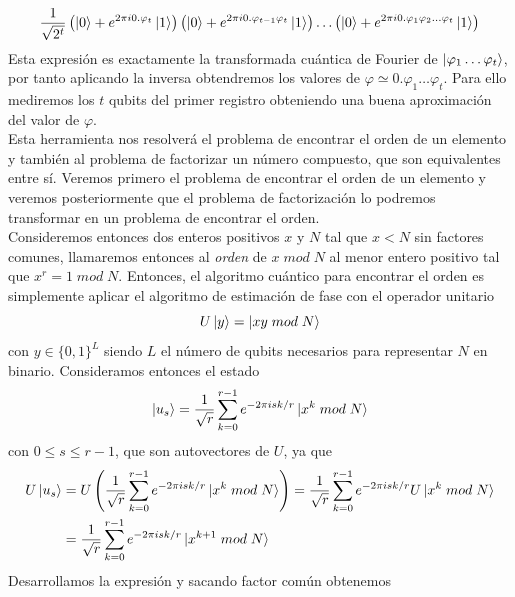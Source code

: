 \documentclass[a4paper]{article}
\numberwithin{equation}{section}
\newcommand{\modd}{\; mod \;}
\begin{document}
\begin{equation}
\frac{1}{\sqrt{2^t}}
\left( \ket{0} + e^{2\pi i 0.\varphi_t} \ket{1} \right)
\left( \ket{0} + e^{2\pi i 0.\varphi_{t-1}\varphi_t} \ket{1} \right)
\ldots
\left( \ket{0} + e^{2\pi i 0.\varphi_1\varphi_2\ldots\varphi_t} \ket{1} \right)
\end{equation}
Esta expresión es exactamente la transformada cuántica de Fourier de $\ket{\varphi_1\ldots\varphi_t}$, por tanto aplicando la inversa obtendremos los valores de $\varphi  \simeq 0.\varphi_1 \ldots \varphi_t$. Para ello mediremos los $t$ qubits del primer registro obteniendo una buena aproximación del valor de $\varphi$.\\

Esta herramienta nos resolverá el problema de encontrar el orden de un elemento y también al problema de factorizar un número compuesto, que son equivalentes entre sí. Veremos primero el problema de encontrar el orden de un elemento y veremos posteriormente que el problema de factorización lo podremos transformar en un problema de encontrar el orden.\\
\linebreak
Consideremos entonces dos enteros positivos $x$ y $N$ tal que $x<N$ sin factores comunes, llamaremos entonces al \textit{orden} de $x \modd N$ al menor entero positivo tal que $x^r =  1\modd N$. Entonces, el algoritmo cuántico para encontrar el orden es simplemente aplicar el algoritmo de estimación de fase con el operador unitario
\begin{equation}
U\ket{y} = \ket{x y \modd N}
\end{equation}
con $y \in \{0, 1\}^L$ siendo $L$ el número de qubits necesarios para representar $N$ en binario. Consideramos entonces el estado
\begin{equation}
\ket{u_s} =
\frac{1}{\sqrt{r}} \sum_{k=0}^{r-1} e^{-2\pi isk/r}\ket{x^k \modd N}
\end{equation}
con $0\leq s \leq r-1$, que son autovectores de $U$, ya que
\begin{equation}
\begin{split}
U\ket{u_s} &=
U\left( \frac{1}{\sqrt{r}} \sum_{k=0}^{r-1} e^{-2\pi isk/r}\ket{x^k \modd N} \right) =
\frac{1}{\sqrt{r}} \sum_{k=0}^{r-1} e^{-2\pi isk/r} U \ket{x^k \modd N}
\\ &=
\frac{1}{\sqrt{r}} \sum_{k=0}^{r-1} e^{-2\pi isk/r}\ket{x^{k+1} \modd N}
\end{split}
\end{equation}
Desarrollamos la expresión y sacando factor común obtenemos
\end{document}
